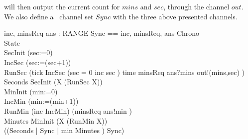 will then output the current count for $mins$ and $sec$, through the channel 
$out$. We also define a \Circus\ channel set $Sync$ with the three above 
presented channels.
\begin{circus}
\circchannel inc, minsReq
\also \circchannel ans : RANGE
\also \circchannelset Sync == \lchanset inc, minsReq, ans \rchanset
\also \circprocess Chrono \circdef\ \circbegin\\
\circstate State  \\
SecInit \circdef (sec:=0)\\
IncSec \circdef (sec:=(sec+1))\\
RunSec \circdef 
(tick \then IncSec \circseq
    (\circif  sec = 0 \circthen inc \then \Skip
    \circelse sec  \circthen \Skip \circfi)
    \extchoice time \then minsReq \then ans?mins \then out!(mins,sec) 
      \then \Skip )  \\
Seconds \circdef SecInit \circseq (\circmu X \circspot (RunSec \circseq X))\\
MinInit \circdef (min:=0)\\
IncMin \circdef (min:=(min+1))\\
RunMin \circdef (inc \then IncMin) \extchoice (minsReq \then ans!min \then \Skip)\\
Minutes \circdef MinInit \circseq (\circmu X \circspot (RunMin \circseq X))\\
\circspot ((Seconds  | Sync | {min} \rpar Minutes ) \circhide Sync)\\
\circend
\end{circus}

